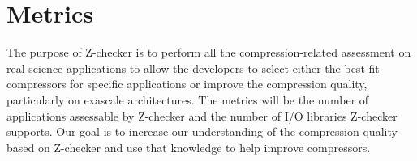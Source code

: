 \section{Metrics}

The purpose of Z-checker is to perform all the compression-related assessment on real science applications
to allow the developers to select either the best-fit compressors for specific applications or improve the compression quality, particularly on 
exascale architectures. The metrics will be the number of applications assessable by Z-checker and the number of I/O libraries Z-checker supports.  Our goal is to increase our understanding of the compression quality based on Z-checker and use that knowledge to help improve compressors.

